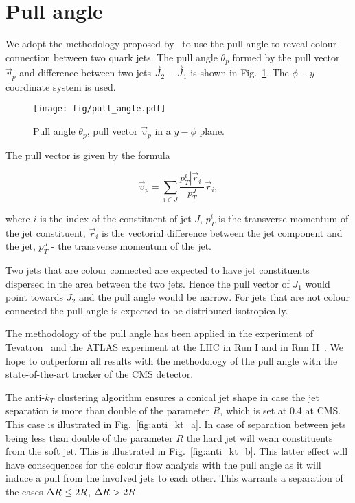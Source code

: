 \section{Pull angle}

We adopt the methodology proposed by~\cite{Gallicchio:2010sw} to use the pull angle to reveal colour connection between two quark jets. The pull angle $\theta_{p}$ formed by the pull vector $\vec{v}_{p}$ and difference between two jets $\vec{J}_{2}-\vec{J}_{1}$ is shown in Fig.~\ref{fig:pull_angle}. The $\phi-y$ coordinate system is used. 

\begin{figure}[hbtp]
  \centering
  \texttt{[image: fig/pull\_angle.pdf]}
  \caption{Pull angle $\theta_{p}$, pull vector $\vec{v}_{p}$ in a $y-\phi$ plane.}
  \label{fig:pull_angle}
\end{figure}

The pull vector is given by the formula

\begin{equation}
  \vec{v}_{p}=\sum_{i\in J}\frac{p^{i}_{T}|\vec{r}_{i}|}{p^{J}_{T}}\vec{r}_{i},
  \label{Eq:pull_angle}
\end{equation}

where $i$ is the index of the constituent of jet $J$, $p^{i}_{T}$ is the transverse momentum of the jet constituent, $\vec{r}_{i}$ is the vectorial difference between the jet component and the jet, $p^{J}_{T}$ - the transverse momentum of the jet.

Two jets that are colour connected are expected to have jet constituents dispersed in the area between the two jets. Hence the pull vector of $J_{1}$ would point towards $J_{2}$ and the pull angle would be narrow. For jets that are not colour connected the pull angle is expected to be distributed isotropically.

The methodology of the pull angle has been applied in the \DZERO experiment of Tevatron~\cite{Abazov:2011vh} and the ATLAS experiment at the LHC in Run I \cite{Aad:2015lxa} and in Run II~\cite{ATLAS:2017iaz}. We hope to outperform all results with the methodology of the pull angle with the state-of-the-art tracker of the CMS detector.

The anti-$k_{T}$ clustering algorithm ensures a conical jet shape in case the jet separation \DeltaR is more than double of the parameter $R$, which is set at 0.4 at CMS. This case is illustrated in Fig.~\ref{fig:anti_kt_a}. In case of separation between jets \DeltaR being less than double of the parameter $R$ the hard jet will wean constituents from the soft jet. This is illustrated in Fig.~\ref{fig:anti_kt_b}. This latter effect will have consequences for the colour flow analysis with the pull angle as it will induce a pull from the involved jets to each other. This warrants a separation of the cases $\Delta R^{}\leq2R$, $\Delta R^{}>2R$. 

